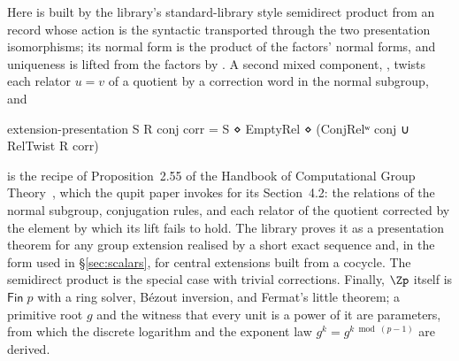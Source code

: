 \noindent Here  is built by the library's standard-library
style semidirect product from an  record whose action is the
syntactic  transported through the two presentation
isomorphisms; its normal form is the product of the factors' normal
forms, and uniqueness is lifted from the factors by
.  A second mixed component, ,
twists each relator $u = v$ of a quotient by a correction word in the
normal subgroup, and
\begingroup\renewcommand{\AgdaCodeStyle}{\footnotesize}
\begin{code}
extension-presentation S R conj corr = S ⋄ EmptyRel ⋄ (ConjRelʷ conj ∪ RelTwist R corr)
\end{code}
\endgroup
is the recipe of Proposition~2.55 of the Handbook of Computational Group
Theory~\cite{holt2005handbook}, which the qupit paper invokes for its
Section~4.2: the relations of the normal subgroup, conjugation rules,
and each relator of the quotient corrected by the element by which its
lift fails to hold.  The library proves it as a presentation theorem for
any group extension realised by a short exact sequence and, in the form
used in \S\ref{sec:scalars}, for central extensions built from a
cocycle.  The semidirect product is the special case with trivial
corrections.  Finally, $\Zp$ itself is $\mathsf{Fin}\;p$ with a ring
solver, B\'ezout inversion, and Fermat's little theorem; a primitive
root $g$ and the witness that every unit is a power of it are
parameters, from which the discrete logarithm and the exponent law
$g^{k} = g^{k \bmod (p-1)}$ are derived.
